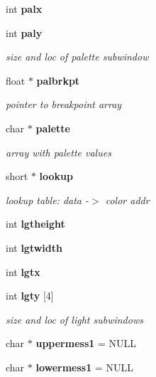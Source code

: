 \begin{CompactItemize}
\item 
int {\bf palx}\label{xtvutils_8c_a118}

\item 
int {\bf paly}\label{xtvutils_8c_a119}

\begin{CompactList}\small\item\em size and loc of palette subwindow \item\end{CompactList}\item 
float $\ast$ {\bf palbrkpt}\label{xtvutils_8c_a120}

\begin{CompactList}\small\item\em pointer to breakpoint array \item\end{CompactList}\item 
char $\ast$ {\bf palette}\label{xtvutils_8c_a121}

\begin{CompactList}\small\item\em array with palette values \item\end{CompactList}\item 
short $\ast$ {\bf lookup}\label{xtvutils_8c_a122}

\begin{CompactList}\small\item\em lookup table: data -$>$ color addr \item\end{CompactList}\item 
int {\bf lgtheight}\label{xtvutils_8c_a123}

\item 
int {\bf lgtwidth}\label{xtvutils_8c_a124}

\item 
int {\bf lgtx}\label{xtvutils_8c_a125}

\item 
int {\bf lgty} [4]\label{xtvutils_8c_a126}

\begin{CompactList}\small\item\em size and loc of light subwindows \item\end{CompactList}\item 
char $\ast$ {\bf uppermess1} = NULL\label{xtvutils_8c_a128}

\item 
char $\ast$ {\bf lowermess1} = NULL\label{xtvutils_8c_a129}


\end{CompactItemize}
